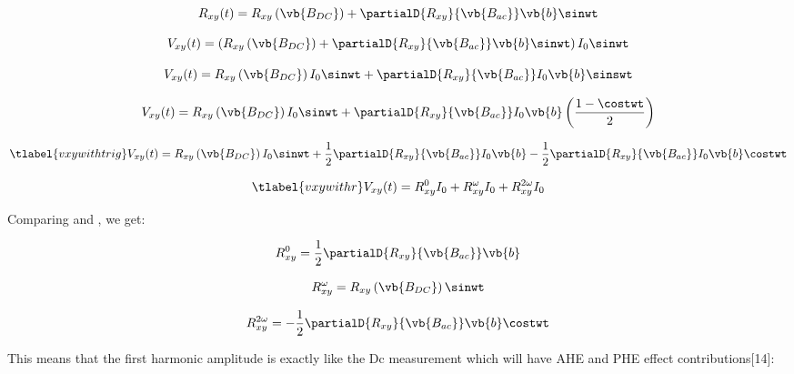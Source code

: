 \begin{equation}
    R_{xy}(t) = R_{xy} \left( \vb{B_{DC}} \right) + \partialD{R_{xy}}{\vb{B_{ac}}} \vb{b} \sinwt
\end{equation}

\begin{equation}
    V_{xy}(t) = \left( 
        R_{xy} \left( \vb{B_{DC}} \right) +
        \partialD{R_{xy}}{\vb{B_{ac}}} \vb{b} \sinwt
    \right) I_{0} \sinwt
\end{equation}

\begin{equation}
    V_{xy}(t) = R_{xy} \left( \vb{B_{DC}} \right) I_{0} \sinwt + 
    \partialD{R_{xy}}{\vb{B_{ac}}} I_{0} \vb{b} \sinswt
\end{equation}

\begin{equation}
    V_{xy}(t) = R_{xy} \left( \vb{B_{DC}} \right) I_{0} \sinwt + 
    \partialD{R_{xy}}{\vb{B_{ac}}} I_{0} \vb{b} \left( \frac{1 - \costwt}{2} \right)
\end{equation}

\begin{equation}
    \tlabel{vxywithtrig}
    V_{xy}(t) = R_{xy} \left( \vb{B_{DC}} \right) I_{0} \sinwt + 
    \frac{1}{2} \partialD{R_{xy}}{\vb{B_{ac}}} I_{0} \vb{b}  - 
    \frac{1}{2} \partialD{R_{xy}}{\vb{B_{ac}}} I_{0} \vb{b} \costwt
\end{equation}

\begin{equation}
    \tlabel{vxywithr}
    V_{xy}(t) = R^{0}_{xy} I_{0} + R^{\omega}_{xy} I_{0} + R^{2 \omega}_{xy} I_{0}
\end{equation}

Comparing  and , we get:

\begin{equation}
    R^{0}_{xy} = \frac{1}{2} \partialD{R_{xy}}{\vb{B_{ac}}} \vb{b} 
\end{equation}

\begin{equation}
    R^{\omega}_{xy} = R_{xy} \left( \vb{B_{DC}} \right)  \sinwt 
\end{equation}

\begin{equation}
    R^{2 \omega}_{xy}  = - \frac{1}{2} \partialD{R_{xy}}{\vb{B_{ac}}} \vb{b} \costwt
\end{equation}

This means that the first harmonic amplitude is exactly like the Dc measurement which 
will have AHE and PHE effect contributions[14]:

